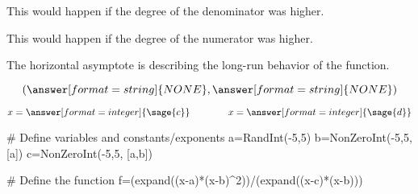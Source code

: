 {\begin{problem}
\begin{problem}
\begin{problem}
\begin{feedback}[HA=0]
This would happen if the degree of the denominator was higher.
\end{feedback}

\begin{feedback}[HA>1]
This would happen if the degree of the numerator was higher.
\end{feedback}

\begin{feedback}[correct]
The horizontal asymptote is describing the long-run behavior of the function.
\end{feedback}


\end{problem}

\[(\answer[format=string]{NONE}, \answer[format=string]{NONE})\]

\end{problem}

\[x=\answer[format=integer]{\sage{c}}\qquad\qquad x=\answer[format=integer]{\sage{d}}\]

\end{problem}}%

\begin{sagesilent}
# Define variables and constants/exponents
a=RandInt(-5,5)
b=NonZeroInt(-5,5, [a])
c=NonZeroInt(-5,5, [a,b])

# Define the function
f=(expand((x-a)*(x-b)^2))/(expand((x-c)*(x-b)))

\end{sagesilent}
 
